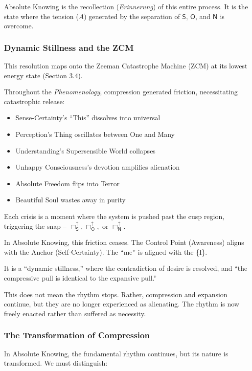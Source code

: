 \documentclass[12pt]{book}
\newcommand{\SBoxUp}{\Box_{\mathsf{S}}^{\uparrow}}
\newcommand{\OBoxUp}{\Box_{\mathsf{O}}^{\uparrow}}
\newcommand{\NBoxUp}{\Box_{\mathsf{N}}^{\uparrow}}
\begin{document}
Absolute Knowing is the recollection (\emph{Erinnerung}) of this entire process. It is the state where the tension ($A$) generated by the separation of $\mathsf{S}$, $\mathsf{O}$, and $\mathsf{N}$ is overcome.

\subsubsection{Dynamic Stillness and the ZCM}

This resolution maps onto the Zeeman Catastrophe Machine (ZCM) at its lowest energy state (Section 3.4).

Throughout the \emph{Phenomenology}, compression generated friction, necessitating catastrophic release:
\begin{itemize}
\item Sense-Certainty's ``This'' dissolves into universal
\item Perception's Thing oscillates between One and Many
\item Understanding's Supersensible World collapses
\item Unhappy Consciousness's devotion amplifies alienation
\item Absolute Freedom flips into Terror
\item Beautiful Soul wastes away in purity
\end{itemize}

Each crisis is a moment where the system is pushed past the cusp region, triggering the snap -- $\SBoxUp, \OBoxUp,$ or $\NBoxUp$.

In Absolute Knowing, this friction ceases. The Control Point (Awareness) aligns with the Anchor (Self-Certainty). The ``me'' is aligned with the \{I\}.

It is a ``dynamic stillness,'' where the contradiction of desire is resolved, and ``the compressive pull is identical to the expansive pull.''

This does not mean the rhythm stops. Rather, compression and expansion continue, but they are no longer experienced as alienating. The rhythm is now freely enacted rather than suffered as necessity.

\subsubsection{The Transformation of Compression}

In Absolute Knowing, the fundamental rhythm continues, but its nature is transformed. We must distinguish:
\end{document}
